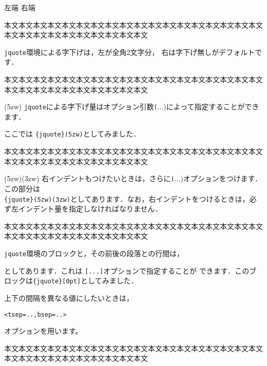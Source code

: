 \noindent
左端 \hfill 右端\par
本文本文本文本文本文本文本文本文本文本文本文本文本文本文本文本文本文本文本文本文本文本文本文本文本文本文本文本文
\begin{jquote}
\texttt{jquote}環境による字下げは，左が全角2文字分，
右は字下げ無しがデフォルトです．
\end{jquote}
本文本文本文本文本文本文本文本文本文本文本文本文本文本文本文本文本文本文本文本文本文本文本文本文本文本文本文本文
\begin{jquote}(5zw)
\texttt{jquote}による字下げ量はオプション引数\texttt(...)によって指定することができます．\par
ここでは \texttt{\{jquote\}(5zw)}としてみました．
\end{jquote}
本文本文本文本文本文本文本文本文本文本文本文本文本文本文本文本文本文本文本文本文本文本文本文本文本文本文本文本文
\begin{jquote}(5zw)(3zw)
右インデントもつけたいときは，さらに\texttt(...)オプションをつけます．この部分は\\\texttt{\{jquote\}(5zw)(3zw)}としてあります．なお，右インデントをつけるときは，必ず左インデント量を指定しなければなりません．
\end{jquote}
本文本文本文本文本文本文本文本文本文本文本文本文本文本文本文本文本文本文本文本文本文本文本文本文本文本文本文本文
\begin{jquote}[0pt]
\texttt{jquote}環境のブロックと，その前後の段落との行間は，
    \begin{jquote}
    \end{jquote}
としてあります．これは \texttt{[...]}オプションで指定することが
できます．このブロックは\texttt{\{jquote\}[0pt]}としてみました．
\the\topsep

上下の間隔を異なる値にしたいときは，
\begin{jquote}
\begin{verbatim}
<tsep=..,bsep=..>
\end{verbatim}
\end{jquote}
オプションを用います。
\end{jquote}
本文本文本文本文本文本文本文本文本文本文本文本文本文本文本文本文本文本文本文本文本文本文本文本文本文本文本文本文
